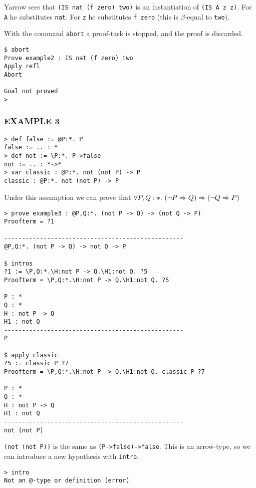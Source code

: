 Yarrow sees that {\tt (IS nat (f zero) two)}
is an instantiation of {\tt (IS A z z)}.
For {\tt A} he substitutes {\tt nat}.
For {\tt z} he substitutes {\tt f zero}
(this is $\beta$-equal to {\tt two}).

With the command {\tt abort}
a proof-task is stopped, and the proof is discarded.

\begin{verbatim}
$ abort
Prove example2 : IS nat (f zero) two
Apply refl
Abort

Goal not proved
>
\end{verbatim}


\subsubsection*{EXAMPLE 3}

\begin{verbatim}
> def false := @P:*. P
false := .. : *
> def not := \P:*. P->false
not := .. : *->*
> var classic : @P:*. not (not P) -> P
classic : @P:*. not (not P) -> P
\end{verbatim}
Under this assumption we can prove that
$
\forall P,Q:\st.\
(\neg P \Rightarrow Q) \Rightarrow  (\neg Q \Rightarrow P )
$
\begin{verbatim}
> prove example3 : @P,Q:*. (not P -> Q) -> (not Q -> P)
Proofterm = ?1

--------------------------------------------------
@P,Q:*. (not P -> Q) -> not Q -> P

$ intros
?1 := \P,Q:*.\H:not P -> Q.\H1:not Q. ?5
Proofterm = \P,Q:*.\H:not P -> Q.\H1:not Q. ?5

P : *
Q : *
H : not P -> Q
H1 : not Q
--------------------------------------------------
P

$ apply classic
?5 := classic P ?7
Proofterm = \P,Q:*.\H:not P -> Q.\H1:not Q. classic P ?7

P : *
Q : *
H : not P -> Q
H1 : not Q
--------------------------------------------------
not (not P)
\end{verbatim}

{\tt (not (not P))} is the same as {\tt (P->false)->false}.
This is an arrow-type, so we can introduce a new hypothesis with {\tt intro}.

\begin{verbatim}
> intro
Not an @-type or definition (error)
\end{verbatim}


